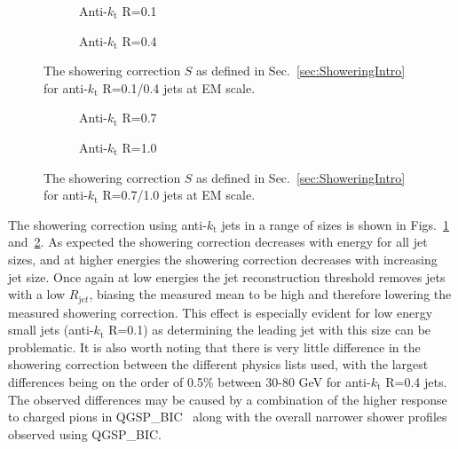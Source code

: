 \begin{figure}[!ht]
  \centering
  \begin{subfigure}{.5\textwidth}
    \centering
    \caption{Anti-$k_\mathrm{t}$ R=0.1}
  \end{subfigure}%
  \begin{subfigure}{.5\textwidth}  \centering
    \caption{Anti-$k_\mathrm{t}$ R=0.4}
  \end{subfigure}
  \caption[Showering correction using anti-$k_\mathrm{t}$ R=0.1/0.4 jets]
{\small The showering correction $S$ as defined in Sec.~\ref{sec:ShoweringIntro} for anti-$k_\mathrm{t}$ R=0.1/0.4 jets at EM scale.  }
  \label{Fig:Showering_1-4}
\end{figure}

\begin{figure}[!ht]
  \centering
  \begin{subfigure}{.5\textwidth}
    \centering
    \caption{Anti-$k_\mathrm{t}$ R=0.7}
  \end{subfigure}%
  \begin{subfigure}{.5\textwidth}  \centering
    \caption{Anti-$k_\mathrm{t}$ R=1.0}
  \end{subfigure}
  \caption[Showering correction using anti-$k_\mathrm{t}$ R=0.7/1.0 jets]
{\small The showering correction $S$ as defined in Sec.~\ref{sec:ShoweringIntro} for anti-$k_\mathrm{t}$ R=0.7/1.0 jets at EM scale.  }
  \label{Fig:Showering_7-10}
\end{figure}

The showering correction using anti-$k_\mathrm{t}$ jets in a range of sizes is shown in Figs.~\ref{Fig:Showering_1-4} and~\ref{Fig:Showering_7-10}.  
As expected the showering correction decreases with energy for all jet sizes, and at higher energies the showering correction decreases with increasing jet size.  
Once again at low energies the jet reconstruction threshold removes jets with a low $R_{\mathrm jet}$, biasing the measured mean to be high and therefore lowering the measured showering correction.  
This effect is especially evident for low energy small jets (anti-$k_\mathrm{t}$ R=0.1) as determining the leading jet with this size can be problematic.  
It is also worth noting that there is very little difference in the showering correction between the different physics lists used, with the largest differences being on the order of 0.5\% between 30-80 GeV for anti-$k_\mathrm{t}$ R=0.4 jets.  
The observed differences may be caused by a combination of the higher response to charged pions in QGSP\_BIC~\cite{Zhang:2253040} along with the overall narrower shower profiles observed using QGSP\_BIC\cite{Adloff:2013jqa}.  


